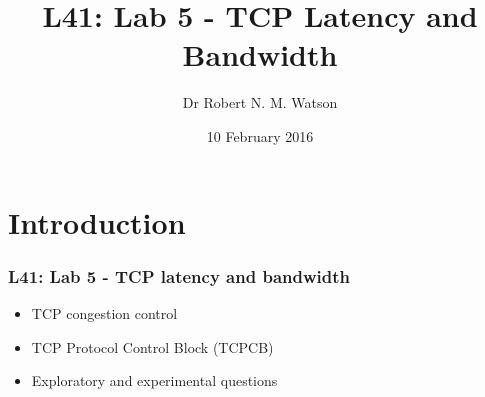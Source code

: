
{
}

\usepackage[english]{babel}
\usepackage[latin1]{inputenc}
\usepackage{graphicx}
\usepackage{times}
\usepackage[T1]{fontenc}
\usepackage{fancyvrb}
\usepackage{hyperref}
\usepackage{listings}


\def\Tiny{\fontsize{4pt}{4pt} \selectfont}

\title{L41: Lab 5 - TCP Latency and Bandwidth}
\author{Dr Robert N. M. Watson}
\date{10 February 2016}

\begin{frame}
  \titlepage
\end{frame}

\section{Introduction}

\begin{frame}
  \frametitle{L41: Lab 5 - TCP latency and bandwidth}

  \begin{itemize}
    \item TCP congestion control
    \item TCP Protocol Control Block (TCPCB)
    \item Exploratory and experimental questions
  \end{itemize}
\end{frame}

